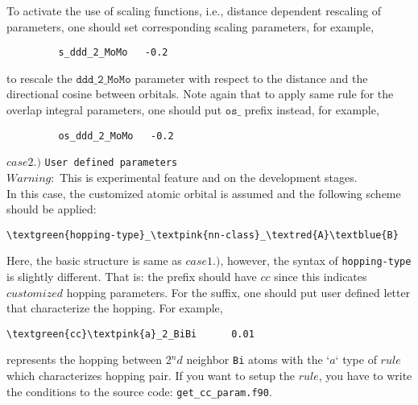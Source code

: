 \documentclass[a4paper,12pt]{scrartcl}
\newcommand{\textred}[1]{\textcolor{red!85!white}{\texttt{#1}}}
\newcommand{\textblue}[1]{\textcolor{blue!85!white}{\texttt{#1}}}
\newcommand{\textgreen}[1]{\textcolor{green!50!black}{\texttt{#1}}}
\newcommand{\textpink}[1]{\textcolor{red!60!yellow}{\texttt{#1}}}
\begin{document}
\begin{description}
        
         To activate the use of scaling functions, i.e., distance dependent rescaling of parameters, 
         one should set corresponding scaling parameters, for example, 
         \begin{verbatim}
         s_ddd_2_MoMo   -0.2
         \end{verbatim}
         to rescale the $\texttt{ddd\_2\_MoMo}$ parameter with respect to the distance and the directional cosine between orbitals. Note again that to apply same rule for the overlap 
         integral parameters, one should put $\texttt{os\_}$ prefix instead, for example,
         \begin{verbatim}
         os_ddd_2_MoMo   -0.2
         \end{verbatim}
        
		\subitem $case 2.)$  \texttt{User defined parameters} \\
		$Warning:$ This is experimental feature and on the development stages. \\
		In this case, the customized atomic orbital is assumed and the 
		following scheme should be applied:
        \begin{Verbatim}[commandchars=\\\{\}]
         \textgreen{hopping-type}_\textpink{nn-class}_\textred{A}\textblue{B}
        \end{Verbatim}
		Here, the basic structure is same as $case 1.)$, however, the syntax of 
		\textgreen{hopping-type} is slightly different. 
		That is: the prefix should have \textgreen{$cc$} since this indicates $customized$ 
		hopping parameters. For the suffix, one should put user defined 
		letter that characterize the hopping.	
		For example,
        \begin{Verbatim}[commandchars=\\\{\}]
         \textgreen{cc}\textpink{a}_2_BiBi      0.01
        \end{Verbatim}
		represents the hopping between 2$^nd$ neighbor \texttt{Bi} atoms with
		the `\textpink{$a$}` type of $rule$ which characterizes hopping pair.
		If you want to setup the $rule$, you have to write the conditions
		to the source code: \texttt{get\_cc\_param.f90}.


	

\end{description}
\end{document}
